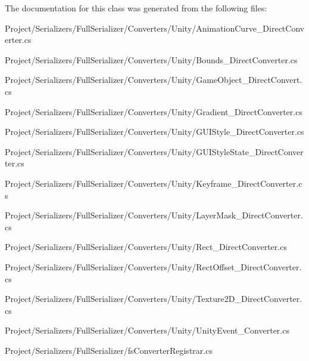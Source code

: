 The documentation for this class was generated from the following files\+:\begin{DoxyCompactItemize}
\item 
Project/\+Serializers/\+Full\+Serializer/\+Converters/\+Unity/Animation\+Curve\+\_\+\+Direct\+Converter.\+cs\item 
Project/\+Serializers/\+Full\+Serializer/\+Converters/\+Unity/Bounds\+\_\+\+Direct\+Converter.\+cs\item 
Project/\+Serializers/\+Full\+Serializer/\+Converters/\+Unity/Game\+Object\+\_\+\+Direct\+Convert.\+cs\item 
Project/\+Serializers/\+Full\+Serializer/\+Converters/\+Unity/Gradient\+\_\+\+Direct\+Converter.\+cs\item 
Project/\+Serializers/\+Full\+Serializer/\+Converters/\+Unity/G\+U\+I\+Style\+\_\+\+Direct\+Converter.\+cs\item 
Project/\+Serializers/\+Full\+Serializer/\+Converters/\+Unity/G\+U\+I\+Style\+State\+\_\+\+Direct\+Converter.\+cs\item 
Project/\+Serializers/\+Full\+Serializer/\+Converters/\+Unity/Keyframe\+\_\+\+Direct\+Converter.\+cs\item 
Project/\+Serializers/\+Full\+Serializer/\+Converters/\+Unity/Layer\+Mask\+\_\+\+Direct\+Converter.\+cs\item 
Project/\+Serializers/\+Full\+Serializer/\+Converters/\+Unity/Rect\+\_\+\+Direct\+Converter.\+cs\item 
Project/\+Serializers/\+Full\+Serializer/\+Converters/\+Unity/Rect\+Offset\+\_\+\+Direct\+Converter.\+cs\item 
Project/\+Serializers/\+Full\+Serializer/\+Converters/\+Unity/Texture2\+D\+\_\+\+Direct\+Converter.\+cs\item 
Project/\+Serializers/\+Full\+Serializer/\+Converters/\+Unity/Unity\+Event\+\_\+\+Converter.\+cs\item 
Project/\+Serializers/\+Full\+Serializer/fs\+Converter\+Registrar.\+cs\end{DoxyCompactItemize}

